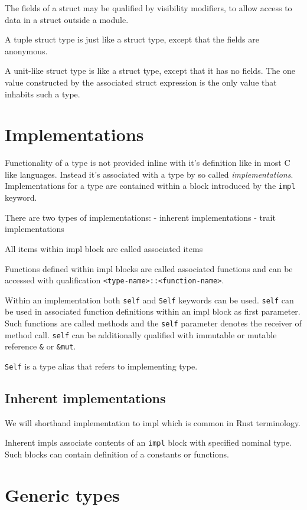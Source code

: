 The fields of a struct may be qualified by visibility modifiers, to allow access to data in a struct outside a module.

A tuple struct type is just like a struct type, except that the fields are anonymous.

A unit-like struct type is like a struct type, except that it has no fields. The one value constructed by the associated struct expression is the only value that inhabits such a type.

\section{Implementations}

Functionality of a type is not provided inline with it's definition like in most C like languages. 
Instead it's associated with a type by so called \textit{implementations}.
Implementations for a type are contained within a block introduced by the \texttt{impl} keyword.

There are two types of implementations:
- inherent implementations
- trait implementations

All items within impl block are called associated items

Functions defined within impl blocks are called associated functions and can be accessed with qualification \texttt{<type-name>::<function-name>}.

Within an implementation both \texttt{self} and \texttt{Self} keywords can be used.
\texttt{self} can be used in associated function definitions within an impl block as first parameter. 
Such functions are called methods and the \texttt{self} parameter denotes the receiver of method call. 
\texttt{self} can be additionally qualified with immutable or mutable reference \texttt{\&} or \texttt{\&mut}.

\texttt{Self} is a type alias that refers to implementing type.

\subsection{Inherent implementations}

We will shorthand implementation to impl which is common in Rust terminology.

Inherent impls associate contents of an \texttt{impl} block with specified nominal type.
Such blocks can contain definition of a constants or functions. 

\section{Generic types}

